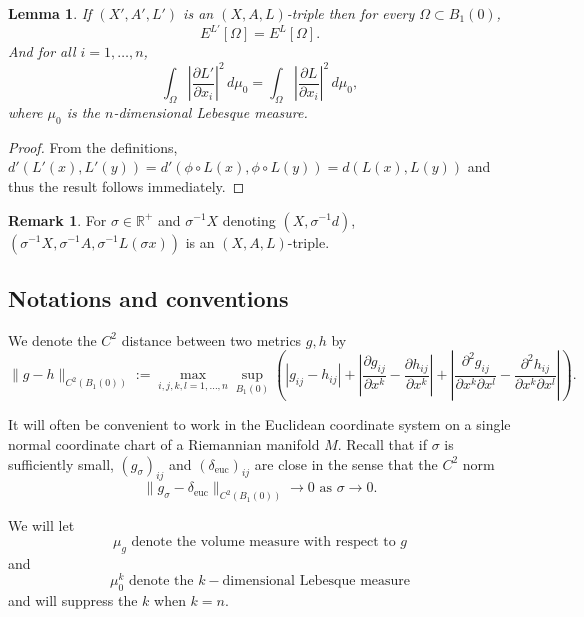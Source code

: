 \documentclass[12pt]{amsart}
\newtheorem{lemma}[theorem]{Lemma}
\theoremstyle{definition}
\newtheorem{remark}[theorem]{Remark}
\numberwithin{equation}{section}
\newcommand{\R}{\mathbb R}
\newcommand{\B}{B}
\newcommand{\deltae}{\delta_{\text{euc}}}
\begin{document}
\begin{lemma}\label{lem:triplesenergy}
If $(X', A', L')$ is an $(X, A, L)$-triple then for every $\Omega \subset \B_1(0)$,
\begin{equation}
E^{L'}[\Omega] =E^{L}[\Omega].
\end{equation}And for all $i = 1, \dots, n$,
\begin{equation}
\int_\Omega \left| \frac{\partial L'}{\partial x_i}\right|^2 \, d\mu_0 = \int_\Omega \left| \frac{\partial L}{\partial x_i}\right|^2 \, d\mu_0 ,
\end{equation}where $\mu_0$ is the $n$-dimensional Lebesque measure.

\end{lemma}
\begin{proof}
From the definitions, $d'(L'(x), L'(y)) = d'(\phi \circ L(x), \phi \circ L(y)) = d(L(x), L(y))$ and thus the result follows immediately.
\end{proof}

\begin{remark} For $\sigma \in \R^+$ and $\sigma^{-1}X$ denoting $(X, \sigma^{-1}d)$, $(\sigma^{-1}X,\sigma^{-1}A,\sigma^{-1}L(\sigma x))$ is an $(X,A,L)$-triple.
\end{remark}


\subsection{Notations and conventions}
We denote the $C^2$ distance between two metrics $g,h$ by
\[
\|g-h\|_{C^2(B_1(0))}:= \max_{i,j, k, l=1, \dots, n} \sup_{B_1(0)}  \left( |g_{ij}-h_{ij}| +\left |\frac{\partial g_{ij}}{\partial x^k}   -\frac{\partial h_{ij}}{\partial x^k}   \right| + \left |\frac{\partial^2 g_{ij}}{\partial x^k \partial x^l}   -\frac{\partial^2 h_{ij}}{\partial x^k \partial x^l}   \right| \right).
\]


It will often be convenient to work in the Euclidean coordinate system on a single normal coordinate chart of a Riemannian manifold $M$.  Recall that if $\sigma$ is sufficiently small, $(g_\sigma)_{ij}$ and $(\deltae)_{ij}$ are close in the sense that the $C^2$ norm
\[
\|g_\sigma-\deltae\|_{C^2(B_1(0))}\to 0 \text{ as } \sigma \to 0.
\]


We will let 
\[
\mu_g \text{ denote the volume measure with respect to }g
\]and\[
\mu_0^k \text{ denote the }k-\text{dimensional Lebesque measure}
\]and will suppress the $k$ when $k = n$. 
\end{document}
